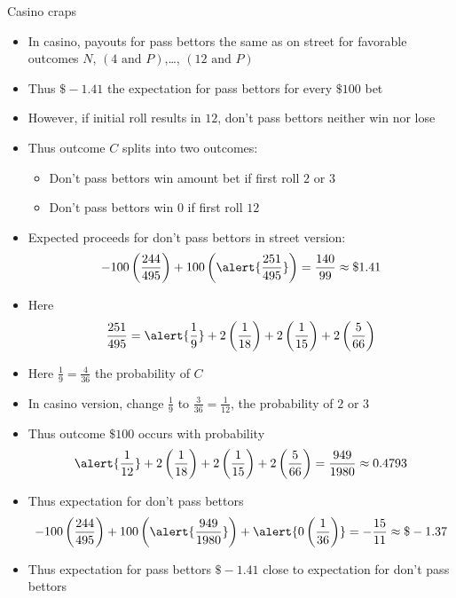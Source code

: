 \documentclass[handout]{beamer}
\theoremstyle{definition}
\begin{document}
\begin{frame}{Casino craps}
\begin{itemize}
\item In casino, payouts for pass bettors the same as on street
for favorable outcomes $N$,
$\left(\text{$4$ and $P$}\right)$,\dots,
$\left(\text{$12$ and $P$}\right)$
\item Thus $\$-1.41$ the expectation for pass bettors
for every $\$100$ bet
\item However, if initial roll results in $12$, don't pass bettors
neither win nor lose
\item Thus outcome $C$ splits into two outcomes:
\begin{itemize}
\item Don't pass bettors win amount bet if first roll $2$ or $3$
\item Don't pass bettors win $0$ if first roll $12$
\end{itemize}
\end{itemize}
\end{frame}

\begin{frame}
\begin{itemize}
\item Expected proceeds for don't pass bettors
in \alert{street} version:
\[-100\left(\frac{244}{495}\right)+100\left(\alert{\frac{251}{495}}\right)
=\frac{140}{99}\approx \$1.41\]
\item Here
\[\frac{251}{495}
=\alert{\frac{1}{9}}+2\left(\frac{1}{18}\right)
+2\left(\frac{1}{15}\right)+2\left(\frac{5}{66}\right)\]
\item Here $\frac{1}{9}=\frac{4}{36}$ the probability of $C$
\item In \alert{casino} version, change $\frac{1}{9}$ to
$\frac{3}{36}=\frac{1}{12}$, the probability of $2$ or $3$
\end{itemize}
\end{frame}

\begin{frame}
\begin{itemize}
\item Thus outcome $\$100$ occurs with probability
\[\alert{\frac{1}{12}}+2\left(\frac{1}{18}\right)
+2\left(\frac{1}{15}\right)+2\left(\frac{5}{66}\right)
=\frac{949}{1980}\approx 0.4793\]
\item Thus expectation for don't pass bettors
\[-100\left(\frac{244}{495}\right)+100\left(\alert{\frac{949}{1980}}\right)
+\alert{0\left(\frac{1}{36}\right)}
=-\frac{15}{11}\approx \$-1.37\]
\item Thus expectation for pass bettors $\$-1.41$
close to expectation for don't pass bettors
\end{itemize}
\end{frame}
\end{document}
